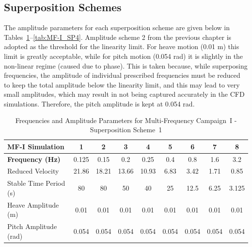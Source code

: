 \documentclass[../main]{subfiles}
\begin{document}
\subsection{Superposition Schemes}

The amplitude parameters for each superposition scheme are given 
below in Tables~\ref{tab:MF-I_SP1}--\ref{tab:MF-I_SP4}. 
Amplitude scheme 2 from the previous chapter is adopted as the 
threshold for the linearity limit. For heave motion (0.01 m) this limit is greatly acceptable, while for pitch motion 
(0.054 rad) it is slightly in the non-linear regime (caused due to phase). This is taken because, while superposing 
frequencies, the amplitude of individual prescribed frequencies must be reduced to keep the total amplitude below the linearity limit, 
and this may lead to very small amplitudes, which may result in not being captured accurately in the CFD simulations. 
Therefore, the pitch amplitude is kept at 0.054 rad. 

\begin{table}[htbp]
\centering
\caption{Frequencies and Amplitude Parameters for Multi-Frequency Campaign~I - Superposition Scheme~1}
\label{tab:MF-I_SP1}
\begin{tabular}{|l|c|c|c|c|c|c|c|c|}
\hline
\rule{0pt}{12pt}\textbf{MF-I Simulation} & 1 & 2 & 3 & 4 & 5 & 6 & 7 & 8 \\[4pt]
\hline
\rule{0pt}{12pt}\textbf{Frequency (Hz)} & 0.125 & 0.15 & 0.2 & 0.25 & 0.4 & 0.8 & 1.6 & 3.2 \\[4pt]
\hline
Reduced Velocity        & 21.86 & 18.21 & 13.66 & 10.93 & 6.83 & 3.42 & 1.71 & 0.85 \\
Stable Time Period (s)  & 80    & 80    & 50    & 40    & 25   & 12.5 & 6.25 & 3.125 \\
Heave Amplitude (m)     & 0.01 & 0.01 & 0.01 & 0.01 & 0.01 & 0.01 & 0.01 & 0.01 \\
Pitch Amplitude (rad)   & 0.054 & 0.054 & 0.054 & 0.054 & 0.054 & 0.054 & 0.054 & 0.054 \\
\hline
\end{tabular}
\end{table}
\end{document}
